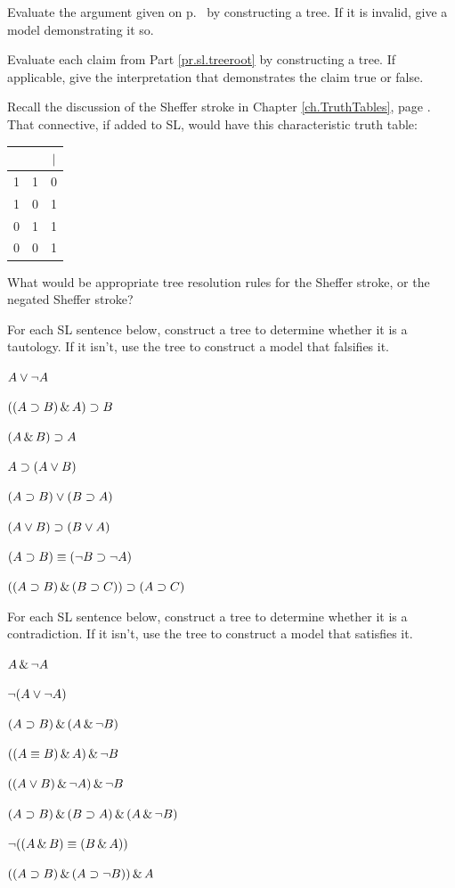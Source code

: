 \solutions
\problempart 
\label{pr.sl.agtree}
Evaluate the argument given on p.\ \pageref{8letterargument} by constructing a tree. If it is invalid, give a model demonstrating it so.

\solutions
\problempart Evaluate each claim from Part \ref{pr.sl.treeroot} by constructing a tree. If applicable, give the interpretation that demonstrates the claim true or false.
\label{tree.examples}

\problempart Recall the discussion of the Sheffer stroke in Chapter \ref{ch.TruthTables}, page \pageref{pr.sheffer}.  That connective, if added to SL, would have this characteristic truth table:

\begin{center}
\begin{tabular}{c|c|c}
\metaA{} & \metaB{} & \metaA{}$|$\metaB{}\\
\hline
1 & 1 & 0\\
1 & 0 & 1\\
0 & 1 & 1\\
0 & 0 & 1
\end{tabular}
\end{center}

What would be appropriate tree resolution rules for the Sheffer stroke, or the negated Sheffer stroke?

\problempart
For each SL sentence below, construct a tree to determine whether it is a tautology. If it isn't, use the tree to construct a model that falsifies it.

\begin{earg}
\item $A \vee \neg A$
\item $((A \supset B) \,\&\, A) \supset B$
\item $(A \,\&\, B) \supset A$
\item $A \supset (A \vee B)$
\item $(A \supset B) \vee (B \supset A)$
\item $(A \vee B) \supset (B \vee A)$
\item $(A \supset B) \equiv (\neg B \supset \neg A)$
\item $((A \supset B) \,\&\, (B \supset C)) \supset (A \supset C)$
\end{earg}

\problempart
For each SL sentence below, construct a tree to determine whether it is a contradiction. If it isn't, use the tree to construct a model that satisfies it.

\begin{earg}
\item $A \,\&\, \neg A$
\item $\neg (A \vee \neg A)$
\item $(A \supset B) \,\&\, (A \,\&\, \neg B)$
\item $((A \equiv B) \,\&\, A) \,\&\, \neg B$
\item $((A \vee B) \,\&\, \neg A) \,\&\, \neg B$
\item $(A \supset B) \,\&\, (B \supset A) \,\&\, (A \,\&\, \neg B)$
\item $\neg ((A \,\&\, B) \equiv (B \,\&\, A))$
\item $((A \supset B) \,\&\, (A \supset \neg B)) \,\&\, A$
\end{earg}

